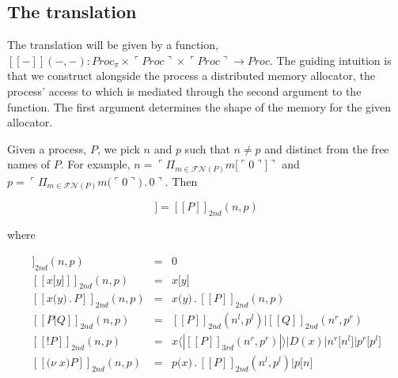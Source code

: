 \documentclass[]{amsart}
\newcommand{\ldb}{[\![}
\newcommand{\rdb}{]\!]}
\newcommand{\lliftb}{\langle\!|}
\newcommand{\rliftb}{|\!\rangle}
\newcommand{\lpquote}{\ulcorner}
\newcommand{\rpquote}{\urcorner}
\newcommand{\id}[1]{\texttt{#1}}
\newcommand{\pzero}{\mathbin{0}}
\newcommand{\juxtap}{\mathbin{\id{|}}}
\newcommand{\concat}{\mathbin{.}}
\newcommand{\freenames}[1]{\mathbin{\mathcal{FN}(#1)}}
\newcommand{\binpar}[2]{#1 \juxtap #2}
\newcommand{\outputp}[2]{#1 \id{[} #2 \id{]}}
\newcommand{\prefix}[3]{#1 \id{(} #2 \id{)} \concat #3}
\newcommand{\lift}[2]{#1 \lliftb #2 \rliftb}
\newcommand{\quotep}[1]{\lpquote #1 \rpquote}
\newcommand{\meaningof}[1]{\ldb #1 \rdb}
\newcommand{\Proc}{\mathbin{Proc}}
\newcommand{\QProc}{\quotep{\mathbin{Proc}}}
\newcommand{\red}{\rightarrow}
\theoremstyle{definition}
\theoremstyle{remark}
\numberwithin{equation}{subsection}
\begin{document}
\subsection{The translation}

The translation will be given by a function, $\meaningof{-}( -, - ) :
\Proc_{\pi} \times \QProc \times \QProc \red \Proc$. The guiding
intuition is that we construct alongside the process a distributed memory
allocator, the process' access to which is mediated through the second argument
to the function. The first argument determines the shape of the memory
for the given allocator.

Given a process, $P$, we pick $n$ and $p$ such that $n \neq p$ and
distinct from the free names of $P$. For example, $n = \quotep{\Pi_{m
\in \freenames{P}}\outputp{m}{\quotep{\pzero}}}$ and $p =
\quotep{\Pi_{m \in
\freenames{P}}\prefix{m}{\quotep{\pzero}}{\pzero}}$. Then

\begin{equation*}
	\meaningof{P} = \meaningof{P}_{2nd}( n, p )
\end{equation*}

where

\begin{eqnarray*}
   	\meaningof{\pzero}_{2nd} (  n, p )
   		& = &
   		 \pzero \\
   	\meaningof{x \id{[} y \id{]}}_{2nd} (  n, p ) 
  		& = & 
  		x \id{[} y \id{]} \\
   	\meaningof{x \id{(} y \id{)} \concat P}_{2nd} (  n, p ) 
   		& = & 
 		x \id{(} y \id{)} \concat \meaningof{P}_{2nd} (  n, p ) \\
   	\meaningof{P \juxtap Q}_{2nd} (  n, p ) 
   		& = & 
 		\meaningof{P}_{2nd} ( n^{l}, p^{l} )
   			 \juxtap \meaningof{Q}_{2nd} ( n^{r}, p^{r} ) \\
   	\meaningof{\id{!} P}_{2nd} (  n, p )
   		& = & \binpar{\lift{x}{\meaningof{P}_{3rd}( n^{r}, p^{r} )}}
		             {\binpar{D(x)}{\binpar{\outputp{n^{r}}{n^{l}}}{\outputp{p^{r}}{p^{l}}}}} \\
   	\meaningof{\id{(}\nu \; x \id{)} P}_{2nd} (  n, p ) 
   		& = & 
 		\prefix{p}{x}{\binpar{\meaningof{P}_{2nd} ( n^{l}, p^{l} )}{\outputp{p}{n}}} \\
\end{eqnarray*}
\end{document}
